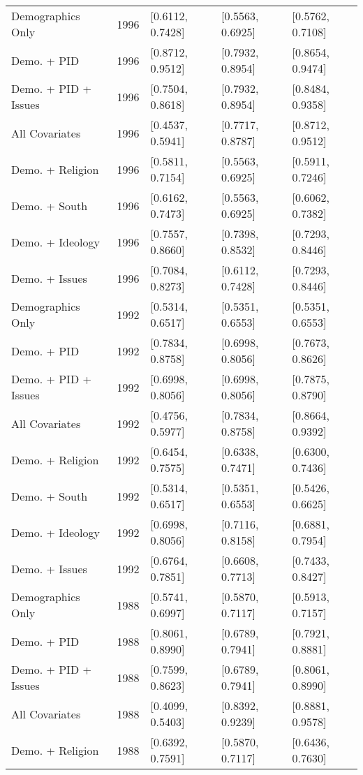 \begin{longtable}{lrlll}
  Demographics Only & 1996 & [0.6112, 0.7428] & [0.5563, 0.6925] & [0.5762, 0.7108] \\ 
  Demo. + PID & 1996 & [0.8712, 0.9512] & [0.7932, 0.8954] & [0.8654, 0.9474] \\ 
  Demo. + PID + Issues & 1996 & [0.7504, 0.8618] & [0.7932, 0.8954] & [0.8484, 0.9358] \\ 
  All Covariates & 1996 & [0.4537, 0.5941] & [0.7717, 0.8787] & [0.8712, 0.9512] \\ 
  Demo. + Religion & 1996 & [0.5811, 0.7154] & [0.5563, 0.6925] & [0.5911, 0.7246] \\ 
  Demo. + South & 1996 & [0.6162, 0.7473] & [0.5563, 0.6925] & [0.6062, 0.7382] \\ 
  Demo. + Ideology & 1996 & [0.7557, 0.8660] & [0.7398, 0.8532] & [0.7293, 0.8446] \\ 
  Demo. + Issues & 1996 & [0.7084, 0.8273] & [0.6112, 0.7428] & [0.7293, 0.8446] \\ 
  Demographics Only & 1992 & [0.5314, 0.6517] & [0.5351, 0.6553] & [0.5351, 0.6553] \\ 
  Demo. + PID & 1992 & [0.7834, 0.8758] & [0.6998, 0.8056] & [0.7673, 0.8626] \\ 
  Demo. + PID + Issues & 1992 & [0.6998, 0.8056] & [0.6998, 0.8056] & [0.7875, 0.8790] \\ 
  All Covariates & 1992 & [0.4756, 0.5977] & [0.7834, 0.8758] & [0.8664, 0.9392] \\ 
  Demo. + Religion & 1992 & [0.6454, 0.7575] & [0.6338, 0.7471] & [0.6300, 0.7436] \\ 
  Demo. + South & 1992 & [0.5314, 0.6517] & [0.5351, 0.6553] & [0.5426, 0.6625] \\ 
  Demo. + Ideology & 1992 & [0.6998, 0.8056] & [0.7116, 0.8158] & [0.6881, 0.7954] \\ 
  Demo. + Issues & 1992 & [0.6764, 0.7851] & [0.6608, 0.7713] & [0.7433, 0.8427] \\ 
  Demographics Only & 1988 & [0.5741, 0.6997] & [0.5870, 0.7117] & [0.5913, 0.7157] \\ 
  Demo. + PID & 1988 & [0.8061, 0.8990] & [0.6789, 0.7941] & [0.7921, 0.8881] \\ 
  Demo. + PID + Issues & 1988 & [0.7599, 0.8623] & [0.6789, 0.7941] & [0.8061, 0.8990] \\ 
  All Covariates & 1988 & [0.4099, 0.5403] & [0.8392, 0.9239] & [0.8881, 0.9578] \\ 
  Demo. + Religion & 1988 & [0.6392, 0.7591] & [0.5870, 0.7117] & [0.6436, 0.7630] \\ 

\end{longtable}

